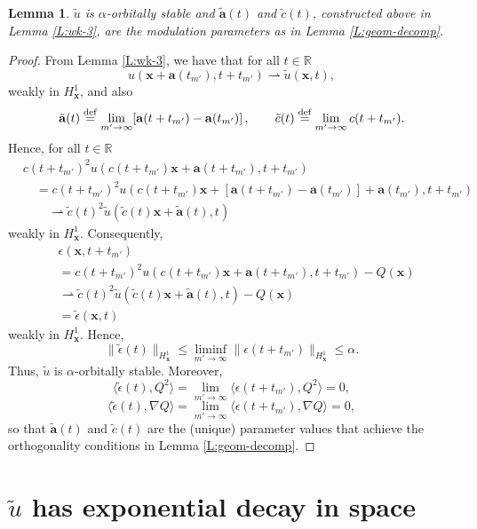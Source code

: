 \documentclass[12pt,letterpaper]{amsart}
\newcommand{\la}{\langle}
\newcommand{\ra}{\rangle}
\newcommand{\defeq}{\stackrel{\rm{def}}{=}}
\newtheorem{lemma}[theorem]{Lemma}
\theoremstyle{remark}
\numberwithin{equation}{section}
\numberwithin{theorem}{section}
\numberwithin{table}{section}
\begin{document}
\begin{lemma}
\label{L:wk-6}
$\tilde u$ is $\alpha$-orbitally stable and $\tilde{\mathbf{a}}(t)$ and $\tilde c(t)$, constructed above in Lemma \ref{L:wk-3}, are the modulation parameters as in Lemma \ref{L:geom-decomp}. 
\end{lemma}

\begin{proof}
From Lemma \ref{L:wk-3}, we have that for all $t\in \mathbb{R}$
$$
u(\mathbf{x}+\mathbf{a}(t_{m'}),t+t_{m'}) \rightharpoonup \tilde u(\mathbf{x},t),
$$
weakly in $H_{\mathbf{x}}^1$, and also
$$
\tilde{\mathbf{a}}(t) \defeq \lim_{m'\to \infty} [\mathbf{a}(t+t_{m'}) - \mathbf{a}(t_{m'})]\,, \qquad \tilde c(t) \defeq \lim_{m'\to \infty} c(t+t_{m'}).
$$
Hence, for all $t\in \mathbb{R}$
\begin{align*}
& c(t+t_{m'})^2 u(c(t+t_{m'})\mathbf{x}+\mathbf{a}(t+t_{m'}),t+t_{m'})\\
& \quad = c(t+t_{m'})^2u(c(t+t_{m'})\mathbf{x}+[\mathbf{a}(t+t_{m'})-\mathbf{a}(t_{m'})]+\mathbf{a}(t_{m'}),t+t_{m'}) \\
& \quad \quad \rightharpoonup \tilde c(t)^2 \tilde u(\tilde c(t) \mathbf{x}+\tilde{\mathbf{a}}(t),t)
\end{align*}
weakly in $H_{\mathbf{x}}^1$.  Consequently,
\begin{align*}
&\epsilon(\mathbf{x},t+t_{m'}) \\
&= c(t+t_{m'})^2 u(c(t+t_{m'})\mathbf{x}+\mathbf{a}(t+t_{m'}),t+t_{m'}) -Q(\mathbf{x}) \\
&\rightharpoonup \tilde c(t)^2 \tilde u(\tilde c(t) \mathbf{x}+\tilde{\mathbf{a}}(t),t)
- Q(\mathbf{x})\\
&= \tilde \epsilon(\mathbf{x},t)
\end{align*}
weakly in $H_{\mathbf{x}}^1$. 
Hence,
$$
\| \tilde\epsilon(t) \|_{H_{\mathbf{x}}^1} \leq \liminf_{m'\to \infty} \| \epsilon(t+t_{m'})\|_{H_{\mathbf{x}}^1}\leq \alpha.
$$
Thus, $\tilde u$ is $\alpha$-orbitally stable.  Moreover,
$$
\la \tilde \epsilon(t), Q^2 \ra = \lim_{m'\to \infty} \la \epsilon(t+t_{m'}), Q^2 \ra =0,
$$
$$
\la \tilde \epsilon(t), \nabla Q \ra = \lim_{m'\to \infty} \la \epsilon(t+t_{m'}), \nabla Q \ra =0,
$$
so that $\tilde{\mathbf{a}}(t)$ and $\tilde c(t)$ are the (unique) parameter values that achieve the orthogonality conditions in Lemma \ref{L:geom-decomp}.  
\end{proof}

\section{$\tilde u$ has exponential decay in space}
\label{S:app-mon}
\end{document}
